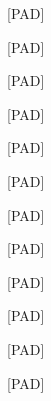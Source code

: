 \documentclass[varwidth=150mm]{standalone}
\begin{document}
\begin{CJK*}{UTF8}{gbsn}
{{{\colorbox{red!0.0}{\strut [PAD]} \colorbox{red!0.0}{\strut [PAD]} \colorbox{red!0.0}{\strut [PAD]} \colorbox{red!0.0}{\strut [PAD]} \colorbox{red!0.0}{\strut [PAD]} \colorbox{red!0.0}{\strut [PAD]} \colorbox{red!0.0}{\strut [PAD]} \colorbox{red!0.0}{\strut [PAD]} \colorbox{red!0.0}{\strut [PAD]} \colorbox{red!0.0}{\strut [PAD]} \colorbox{red!0.0}{\strut [PAD]} \colorbox{red!0.0}{\strut [PAD]}
}}}
\end{CJK*}
\end{document}
